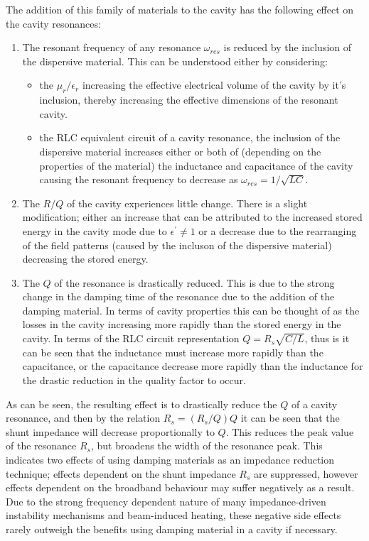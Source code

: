 The addition of this family of materials to the cavity has the following effect on the cavity resonances:

\begin{enumerate}
\item{The resonant frequency of any resonance $\omega_{res}$ is reduced by the inclusion of the dispersive material. This can be understood either by considering:}
\begin{itemize}
\item{the $\mu_{r} / \epsilon_{r}$ increasing the effective electrical volume of the cavity by it's inclusion, thereby increasing the effective dimensions of the resonant cavity.}
\item{the RLC equivalent circuit of a cavity resonance, the inclusion of the dispersive material increases either or both of (depending on the properties of the material) the inductance and capacitance of the cavity causing the resonant frequency to decrease as $\omega_{res} = 1/\sqrt{LC}$.}
\end{itemize}
\item{The $R/Q$ of the cavity experiences little change. There is a slight modification; either an increase that can be attributed to the increased stored energy in the cavity mode due to $\epsilon^{'} \neq 1$ or a decrease due to the rearranging of the field patterns (caused by the incluson of the dispersive material) decreasing the stored energy.}
\item{The $Q$ of the resonance is drastically reduced. This is due to the strong change in the damping time of the resonance due to the addition of the damping material. In terms of cavity properties this can be thought of as the losses in the cavity increasing more rapidly than the stored energy in the cavity. In terms of the RLC circuit representation $Q = R_{s}\sqrt{C/L}$, thus is it can be seen that the inductance must increase more rapidly than the capacitance, or the capacitance decrease more rapidly than the inductance for the drastic reduction in the quality factor to occur.}
\end{enumerate} 

As can be seen, the resulting effect is to drastically reduce the $Q$ of a cavity resonance, and then by the relation $R_{s} = (R_{s}/Q) Q$ it can be seen that the shunt impedance will decrease proportionally to $Q$. This reduces the peak value of the resonance $R_{s}$, but broadens the width of the resonance peak. This indicates two effects of using damping materials as an impedance reduction technique; effects dependent on the shunt impedance $R_{s}$ are suppressed, however effects dependent on the broadband behaviour may suffer negatively as a result. Due to the strong frequency dependent nature of many impedance-driven instability mechanisms and beam-induced heating, these negative side effects rarely outweigh the benefits using damping material in a cavity if necessary.

